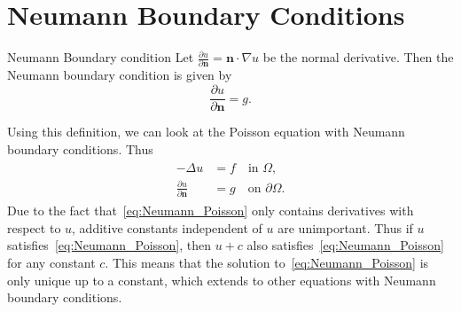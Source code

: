 \section{Neumann Boundary Conditions}

\begin{defn}{Neumann Boundary condition}
    Let $\frac{\partial u}{\partial \mathbf{n}}= \mathbf{n}\cdot \nabla u$ be the normal derivative. Then the Neumann boundary condition is given by
    \begin{equation}
        \frac{\partial u}{\partial \mathbf{n}}  = g.
    \end{equation}
\end{defn}
Using this definition, we can look at the Poisson equation with Neumann boundary conditions. Thus
\begin{align}
\label{eq:Neumann_Poisson}
\begin{split}
    -\Delta u &= f \quad \text{in } \Omega, \\
    \frac{\partial u}{\partial \mathbf{n}} &= g \quad \text{on } \partial \Omega.
\end{split}
\end{align}
Due to the fact that~\eqref{eq:Neumann_Poisson} only contains derivatives with respect to $u$,
 additive constants independent of $u$ are unimportant.
Thus if $u$ satisfies~\eqref{eq:Neumann_Poisson}, then $u + c$ also satisfies~\eqref{eq:Neumann_Poisson} for any constant $c$.
This means that the solution to~\eqref{eq:Neumann_Poisson} is only unique up to a constant,
 which extends to other equations with Neumann boundary conditions.

